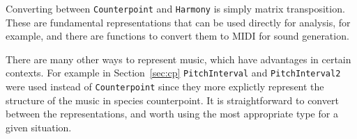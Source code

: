 Converting between \texttt{Counterpoint} and \texttt{Harmony} is
simply matrix transposition. These are fundamental representations
that can be used directly for analysis, for example, and there are
functions to convert them to MIDI for sound generation.

There are many other ways to represent music, which have advantages in
certain contexts. For example in Section~\ref{sec:cp}
\texttt{PitchInterval} and \texttt{PitchInterval2} were used instead
of \texttt{Counterpoint} since they more explictly represent the
structure of the music in species counterpoint. It is straightforward
to convert between the representations, and worth using the most
appropriate type for a given situation.
